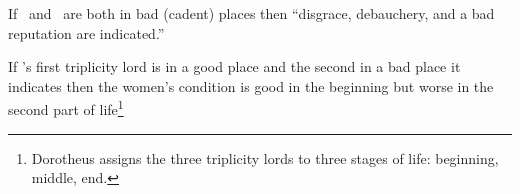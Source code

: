 If \Jupiter\, and \Venus\, are both in bad (cadent) places  then ``disgrace, debauchery, and a bad reputation are indicated.''

If \Venus's first triplicity lord is in a good place and the second in a bad place it indicates then the women's condition is good in the beginning but worse in the second part of life\footnote{Dorotheus assigns the three triplicity lords to three stages of life: beginning, middle, end.}





